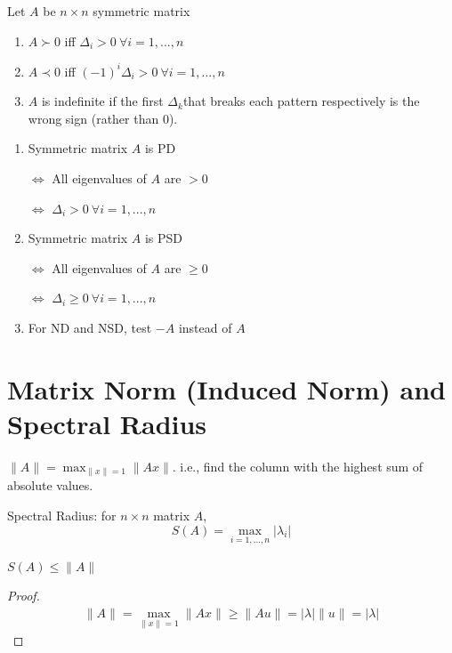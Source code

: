\documentclass[11pt]{elegantbook}
\begin{document}
\begin{theorem}Let $A$ be $n\times n$ symmetric matrix
    \begin{enumerate}
        \item $A\succ 0$ iff $\Delta_i>0\ \forall i=1,...,n$
        \item $A\prec 0$ iff $(-1)^i\Delta_i>0\ \forall i=1,...,n$
        \item $A$ is indefinite if the first $\Delta_k$that breaks each pattern respectively is the wrong sign (rather than 0).
    \end{enumerate}
\end{theorem}
\begin{proposition}
    \quad

\begin{enumerate}
    \item Symmetric matrix $A$ is PD

    $\Leftrightarrow$ All eigenvalues of $A$ are $>0$
    
    $\Leftrightarrow$ $\Delta_i>0\ \forall i=1,...,n$
    \item Symmetric matrix $A$ is PSD

    $\Leftrightarrow$ All eigenvalues of $A$ are $\geq 0$
    
    $\Leftrightarrow$ $\Delta_i\geq 0\ \forall i=1,...,n$
    \item For ND and NSD, test $-A$ instead of $A$
\end{enumerate}
\end{proposition}

\section{Matrix Norm (Induced Norm) and Spectral Radius}
$\|A\|=\max _{\|x\|=1}\|A x\|$. i.e., find the column with the highest sum of absolute values.

Spectral Radius: for $n\times n$ matrix $A$, $$S(A)=\max_{i=1,...,n}|\lambda_i|$$

\begin{proposition}
$S(A)\leq \|A\|$
\end{proposition}
\begin{proof}
\begin{equation}
    \begin{aligned}
        \|A\|=\max _{\|x\|=1}\|A x\|\geq \|Au\|=|\lambda|\|u\|=|\lambda|
    \end{aligned}
    \nonumber
\end{equation}
\end{proof}
\end{document}
